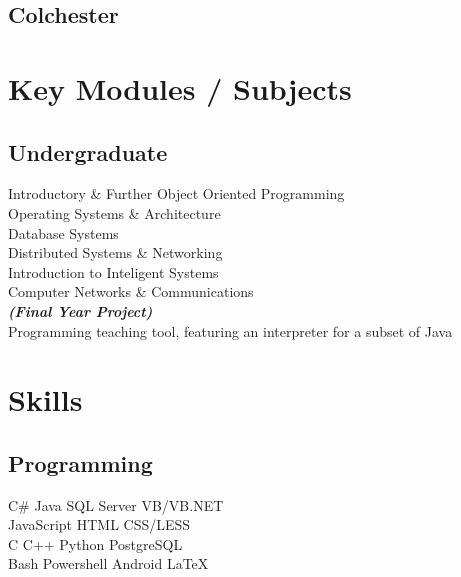 \documentclass[a4paper]{deedy-resume} %
\newcommand{\Csh}{C{\lserif\#}}
\begin{document}
\begin{minipage}[t]{0.33\textwidth}
\subsection{Colchester}


\sectionspace %


\section{Key Modules / Subjects}

\subsection{Undergraduate}

Introductory \& Further Object Oriented Programming \\
Operating Systems \& Architecture \\
Database Systems \\
Distributed Systems \& Networking \\
Introduction to Inteligent Systems \\
Computer Networks \& Communications \\
{\footnotesize \textit{\textbf{(Final Year Project) }}} \\
Programming teaching tool, featuring an interpreter for a subset of Java

\sectionspace %


\section{Skills}

\subsection{Programming}

\Csh{} \textbullet{} Java \textbullet{} SQL Server \textbullet{} VB/VB.NET \\
JavaScript \textbullet{} HTML \textbullet{} CSS/LESS \\ 
C \textbullet{} C++ \textbullet{} Python \textbullet{} PostgreSQL \\
Bash \textbullet{} Powershell \textbullet{} Android \textbullet{} \LaTeX\
\sectionspace %


\end{minipage} %
\end{document}
